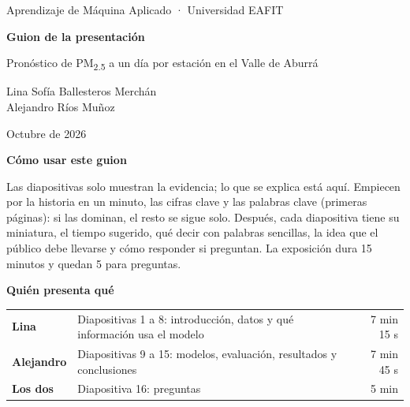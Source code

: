 \documentclass[11pt,a4paper]{article}
\newcommand{\pmd}{PM\textsubscript{2.5}}
\begin{document}
\begin{titlepage}
  \vspace*{40mm}
  {\sffamily\small\color{tenue}Aprendizaje de Máquina Aplicado · Universidad EAFIT}\par\vspace{10pt}
  {\sffamily\fontsize{30}{36}\selectfont\bfseries Guion de la presentación\par}\vspace{8pt}
  {\Large Pronóstico de \pmd{} a un día por estación en el Valle de Aburrá\par}\vspace{24pt}
  {\color{tinta2}Lina Sofía Ballesteros Merchán\\Alejandro Ríos Muñoz\par}\vspace{6pt}
  {\color{tenue}Octubre de 2026\par}
  \vfill
  \begin{tcolorbox}[colback=banda, colframe=banda, arc=0pt, boxrule=0pt, left=12pt, right=12pt, top=10pt, bottom=10pt]
    \textsf{\textbf{Cómo usar este guion}}\par\smallskip
    Las diapositivas solo muestran la evidencia; lo que se explica está aquí. Empiecen por
    la historia en un minuto, las cifras clave y las palabras clave (primeras páginas): si
    las dominan, el resto se sigue solo. Después, cada diapositiva tiene su miniatura, el tiempo sugerido, qué
    decir con palabras sencillas, la idea que el público debe llevarse y cómo responder
    si preguntan. La exposición dura 15 minutos y quedan 5 para preguntas.
  \end{tcolorbox}
  \vspace{8pt}
  \begin{tcolorbox}[colback=ambarsuave, colframe=ambarsuave, arc=0pt, boxrule=0pt, left=12pt, right=12pt, top=10pt, bottom=10pt]
    \textsf{\textbf{Quién presenta qué}}\par\smallskip
    \renewcommand{\arraystretch}{1.2}
    \begin{tabularx}{\linewidth}{>{\bfseries}l X r}
    Lina & Diapositivas 1 a 8: introducción, datos y qué información usa el modelo & 7 min 15 s \\
    Alejandro & Diapositivas 9 a 15: modelos, evaluación, resultados y conclusiones & 7 min 45 s \\
    Los dos & Diapositiva 16: preguntas & 5 min \\
    \end{tabularx}
  \end{tcolorbox}
\end{titlepage}
\end{document}
